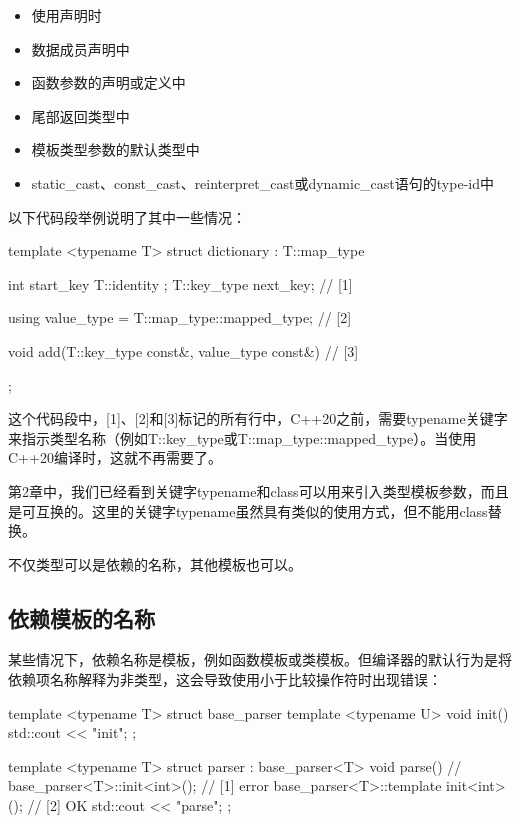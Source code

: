 \begin{itemize}
  \item 使用声明时
  \item 数据成员声明中
  \item 函数参数的声明或定义中
  \item 尾部返回类型中
  \item 模板类型参数的默认类型中
  \item static_cast、const_cast、reinterpret_cast或dynamic_cast语句的type-id中
\end{itemize}

以下代码段举例说明了其中一些情况：

\begin{cppcode}
template <typename T>
struct dictionary : T::map_type
{
	int start_key{ T::identity };
	T::key_type next_key; // [1]

	using value_type = T::map_type::mapped_type; // [2]

	void add(T::key_type const&, value_type const&) {} // [3]
};
\end{cppcode}

这个代码段中，[1]、[2]和[3]标记的所有行中，C++20之前，需要typename关键字来指示类型名称（例如T::key_type或T::map_type::mapped_type）。当使用C++20编译时，这就不再需要了。

\begin{note}
第2章中，我们已经看到关键字typename和class可以用来引入类型模板参数，而且是可互换的。这里的关键字typename虽然具有类似的使用方式，但不能用class替换。
\end{note}

不仅类型可以是依赖的名称，其他模板也可以。

\subsection{依赖模板的名称}

某些情况下，依赖名称是模板，例如函数模板或类模板。但编译器的默认行为是将依赖项名称解释为非类型，这会导致使用小于比较操作符时出现错误：

\begin{cppcode}
template <typename T>
struct base_parser
{
	template <typename U>
	void init()
	{
		std::cout << "init\n";
	}
};

template <typename T>
struct parser : base_parser<T>
{
	void parse()
	{
		// base_parser<T>::init<int>(); // [1] error
		base_parser<T>::template init<int>(); // [2] OK
		std::cout << "parse\n";
	}
};
\end{cppcode}

